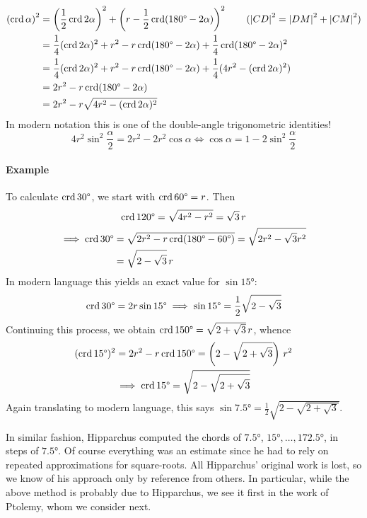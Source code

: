 \begin{align*}
	\left(\crd\alpha\right)^2
	&=\left(\frac 12\crd 2\alpha\right)^2+\left(r-\frac 12\crd(\ang{180}-2\alpha)\right)^2 \tag{$\nm{CD}^2=\nm{DM}^2+\nm{CM}^2$}\\
	&=\frac 14(\crd 2\alpha)^2+r^2-r\crd(\ang{180}-2\alpha)+\frac 14\crd(\ang{180}-2\alpha)^2\\
	&=\frac 14(\crd 2\alpha)^2+r^2-r\crd(\ang{180}-2\alpha)+\frac 14(4r^2-(\crd 2\alpha)^2)\\
	&=2r^2-r\crd(\ang{180}-2\alpha)\\
	&=2r^2-r\sqrt{4r^2-(\crd 2\alpha)^2}
\end{align*}
In modern notation this is one of the double-angle trigonometric identities!
\[
	4r^2\sin^2\frac\alpha 2 =2r^2-2r^2\cos\alpha\iff \cos\alpha=1-2\sin^2\frac\alpha 2
\]


\paragraph{Example} To calculate $\crd \ang{30}$, we start with $\crd\ang{60}=r$. Then
\begin{gather*}
	\crd\ang{120} =\sqrt{4r^2-r^2} =\sqrt 3\,r\\
	\begin{aligned}
	\implies \crd\ang{30} &=\sqrt{2r^2-r\crd(\ang{180}-\ang{60})}
		=\sqrt{2r^2-\sqrt 3r^2}\\
		&=\sqrt{2-\sqrt 3}\,r
	\end{aligned}
\end{gather*}
In modern language this yields an exact value for $\sin\ang{15}$:
\[
	\crd\ang{30} =2r\sin\ang{15}
	\implies\sin\ang{15} =\frac 12\sqrt{2-\sqrt 3}
\]
Continuing this process, we obtain $\crd \ang{150}=\sqrt{2+\sqrt 3}\,r$, whence
\begin{gather*}
	(\crd\ang{15})^2 =2r^2-r\crd\ang{150}
	=\left(2-\sqrt{2+\sqrt 3}\right)\,r^2\\
	\implies \crd\ang{15} =\sqrt{2-\sqrt{2+\sqrt 3}}
\end{gather*}
Again translating to modern language, this says $\sin\ang{7.5}=\frac 12\sqrt{2-\sqrt{2+\sqrt 3}}$.\medbreak

In similar fashion, Hipparchus computed the chords of $\ang{7.5}$, $\ang{15},\ldots,\ang{172.5}$, in steps of $\ang{7.5}$. Of course everything was an estimate since he had to rely on repeated approximations for square-roots. All Hipparchus' original work is lost, so we know of his approach only by reference from others. In particular, while the above method is probably due to Hipparchus, we see it first in the work of Ptolemy, whom we consider next.




